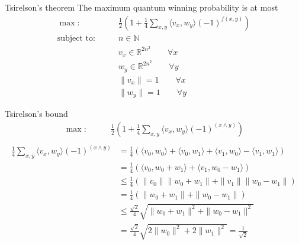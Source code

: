 \documentclass{beamer}
\newcommand\emm[1]{\textcolor{redorange}{{#1}}}
\begin{document}
\begin{frame}{Tsirelson's theorem}
\small
The maximum quantum winning probability is \emm{at most}
\begin{align*}
\max\colon\qquad& \frac12\left(1 + \frac14\sum_{x,y} \langle v_x, w_y\rangle(-1)^{f(x,y)}\right)\\
\text{subject to}\colon\qquad&
n\in\mathbb{N}\\
&v_x \in \mathbb{R}^{2n^2}\qquad \forall x\\
&w_y \in \mathbb{R}^{2n^2}\qquad \forall y\\
&\|v_x\| = 1\qquad \forall x\\
&\|w_y\| = 1\qquad \forall y
\end{align*}
\end{frame}

\begin{frame}{Tsirelson's bound}
\small
\begin{align*}
\max\colon\qquad& \frac12\left(1 + \frac14\sum_{x,y} \langle v_x, w_y\rangle(-1)^{(x\wedge y)}\right)\\
\end{align*}
\begin{align*}
\frac14\sum_{x,y} \langle v_x, w_y\rangle(-1)^{(x\wedge y)}
&= \frac14\left(\langle v_0, w_0\rangle + \langle v_0, w_1\rangle + \langle v_1, w_0\rangle - \langle v_1, w_1\rangle\right)\\
&= \frac14\left(\langle v_0, w_0 + w_1\rangle + \langle v_1, w_0 - w_1\rangle\right)\\
&\le \frac14\left(\|v_0\|\|w_0 + w_1\| + \| v_1\|\|w_0 - w_1\|\right)\\
&= \frac14\left(\|w_0 + w_1\| + \|w_0 - w_1\|\right)\\
&\le \frac{\sqrt{2}}4\sqrt{\|w_0 + w_1\|^2 + \|w_0 - w_1\|^2}\\
&= \frac{\sqrt{2}}4\sqrt{2\|w_0\|^2 + 2\|w_1\|^2}
=\frac1{\sqrt{2}}
\end{align*}
\end{frame}

\end{document}

